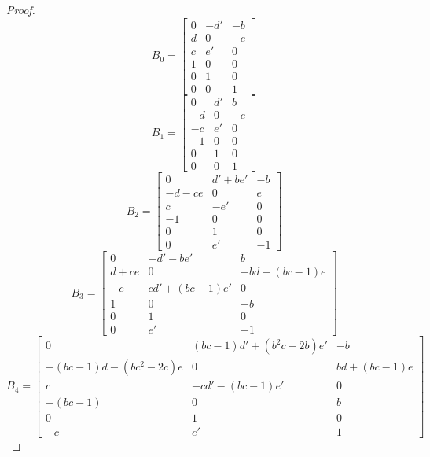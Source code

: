 \documentclass{amsart}
\numberwithin{theorem}{section}
\begin{document}
  \begin{proof}
    \[B_0=\left[\begin{array}{ccc} 0 & -d' & -b \\ d & 0 & -e\\ c & e' & 0\\ 1 & 0 & 0\\ 0 & 1 & 0\\ 0 & 0 & 1\end{array}\right]\]
    \[B_1=\left[\begin{array}{ccc} 0 & d' & b \\ -d & 0 & -e\\ -c & e' & 0\\ -1 & 0 & 0\\ 0 & 1 & 0\\ 0 & 0 & 1\end{array}\right]\]
    \[B_2=\left[\begin{array}{ccc} 0 & d'+be' & -b \\ -d-ce & 0 & e\\ c & -e' & 0\\ -1 & 0 & 0\\ 0 & 1 & 0\\ 0 & e' & -1\end{array}\right]\]
    \[B_3=\left[\begin{array}{ccc} 0 & -d' - be' & b \\ d + ce & 0 & -bd - (bc-1)e\\ -c & cd' + (bc-1)e' & 0\\ 1 & 0 & -b\\ 0 & 1 & 0\\ 0 & e' & -1\end{array}\right]\]
    \[B_4=\left[\begin{array}{ccc} 0 & (bc-1)d' + (b^2c-2b)e' & -b \\ -(bc-1)d - (bc^2-2c)e & 0 & bd + (bc-1)e\\ c & -cd' - (bc-1)e' & 0\\ -(bc-1) & 0 & b\\ 0 & 1 & 0\\ -c & e' & 1\end{array}\right]\]


\end{proof}
\end{document}
